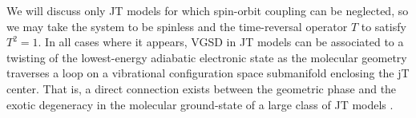 \documentclass[superscriptaddress,showpacs,amsmath,amssymb,pra,twocolumn]{revtex4-1}
\begin{document}
We will discuss only JT models for which spin-orbit coupling can be
neglected, so we may take the system to be spinless and the time-reversal
operator $T$ to satisfy $T^{2}=1$. In all cases where it appears,
VGSD in JT models can be associated to a twisting of the lowest-energy
adiabatic electronic state as the molecular geometry traverses a loop
on a vibrational configuration space submanifold enclosing the jT center.
That is, a direct connection exists between the geometric phase \cite{berry_quantal_1984,mead_geometric_1992,bohm2003geometric}
and the exotic degeneracy in the molecular ground-state of a large
class of JT models \cite{zwanziger_topological_1987,ham_berrys_1987,ceulemans_berry_1991,cullerne_jahn-teller_1994,de_los_rios_dynamical_1996, chancey1997jahn,bersuker_jahn-teller_2006, requist_molecular_2016-1,ribeiro_continuous_2017,bohm2003geometric,ham_role_1990}.
\end{document}
